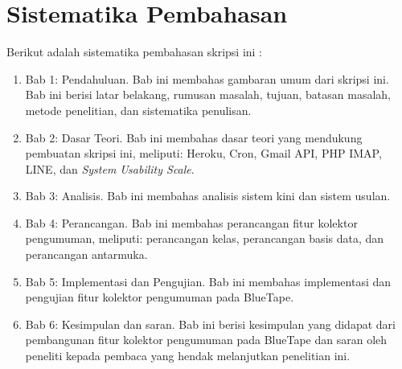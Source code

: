 \section{Sistematika Pembahasan}
\label{sec:sispem}
Berikut adalah sistematika pembahasan skripsi ini :
\begin{enumerate}
\item Bab 1: Pendahuluan. Bab ini membahas gambaran umum dari skripsi ini. Bab ini berisi latar belakang, rumusan masalah, tujuan, batasan masalah, metode penelitian, dan sistematika penulisan.

\item Bab 2: Dasar Teori. Bab ini membahas dasar teori yang mendukung pembuatan skripsi ini, meliputi: Heroku, Cron, Gmail API, PHP IMAP, LINE, dan \textit{System Usability Scale}.

\item Bab 3: Analisis. Bab ini membahas analisis sistem kini dan sistem usulan.

\item Bab 4: Perancangan. Bab ini membahas perancangan fitur kolektor pengumuman, meliputi: perancangan kelas, perancangan basis data, dan perancangan antarmuka.

\item Bab 5: Implementasi dan Pengujian. Bab ini membahas implementasi dan pengujian fitur kolektor pengumuman pada BlueTape.

\item Bab 6: Kesimpulan dan saran. Bab ini berisi kesimpulan yang didapat dari pembangunan fitur kolektor pengumuman pada BlueTape dan saran oleh peneliti kepada pembaca yang hendak melanjutkan penelitian ini. 

\end{enumerate}